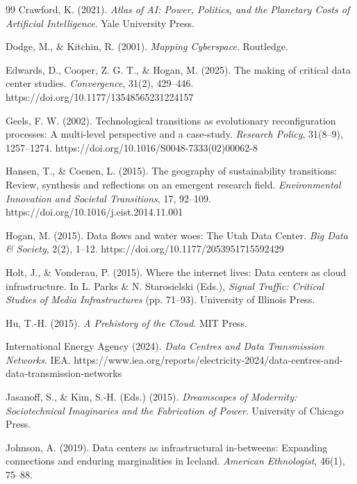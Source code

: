 \documentclass[review]{elsarticle}
\begin{document}
\begin{thebibliography}{99}
Crawford, K. (2021). \textit{Atlas of AI: Power, Politics, and the Planetary Costs of Artificial Intelligence}. Yale University Press.

Dodge, M., \& Kitchin, R. (2001). \textit{Mapping Cyberspace}. Routledge.

Edwards, D., Cooper, Z. G. T., \& Hogan, M. (2025). The making of critical data center studies. \textit{Convergence}, 31(2), 429--446. https://doi.org/10.1177/13548565231224157

Geels, F. W. (2002). Technological transitions as evolutionary reconfiguration processes: A multi-level perspective and a case-study. \textit{Research Policy}, 31(8--9), 1257--1274. https://doi.org/10.1016/S0048-7333(02)00062-8

Hansen, T., \& Coenen, L. (2015). The geography of sustainability transitions: Review, synthesis and reflections on an emergent research field. \textit{Environmental Innovation and Societal Transitions}, 17, 92--109. https://doi.org/10.1016/j.eist.2014.11.001

Hogan, M. (2015). Data flows and water woes: The Utah Data Center. \textit{Big Data \& Society}, 2(2), 1--12. https://doi.org/10.1177/2053951715592429

Holt, J., \& Vonderau, P. (2015). Where the internet lives: Data centers as cloud infrastructure. In L. Parks \& N. Starosielski (Eds.), \textit{Signal Traffic: Critical Studies of Media Infrastructures} (pp. 71--93). University of Illinois Press.

Hu, T.-H. (2015). \textit{A Prehistory of the Cloud}. MIT Press.

International Energy Agency (2024). \textit{Data Centres and Data Transmission Networks}. IEA. https://www.iea.org/reports/electricity-2024/data-centres-and-data-transmission-networks

Jasanoff, S., \& Kim, S.-H. (Eds.) (2015). \textit{Dreamscapes of Modernity: Sociotechnical Imaginaries and the Fabrication of Power}. University of Chicago Press.

Johnson, A. (2019). Data centers as infrastructural in-betweens: Expanding connections and enduring marginalities in Iceland. \textit{American Ethnologist}, 46(1), 75--88.


\end{thebibliography}
\end{document}
